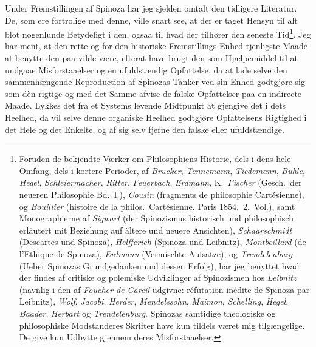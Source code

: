 \documentclass[12pt,a4paper]{book}
\newcommand{\opage}[1]{\marginnote{\footnotesize\textit{[#1]}}}
\begin{document}
Under Fremstillingen af Spinoza har jeg sjelden omtalt den tidligere
Literatur. De, som ere fortrolige med denne, ville snart see, at der
er taget Hensyn til alt blot nogenlunde Betydeligt i den, ogsaa til
hvad der tilhører den seneste Tid\footnote{Foruden de bekjendte Værker
om Philosophiens Historie, dels i dens hele Omfang, dels i kortere
Perioder, af \emph{Brucker}, \emph{Tennemann}, \emph{Tiedemann},
\emph{Buhle}, \emph{Hegel}, \emph{Schleiermacher}, \emph{Ritter},
\emph{Feuerbach}, \emph{Erdmann}, K.\ \emph{Fischer} (Gesch.\ der
neueren Philosophie Bd.\ I.), \emph{Cousin} (fragments de philosophie
Cartésienne), og \emph{Bouillier} (histoire de la philos.\ Cartésienne.
Paris 1854.\ 2.\ Vol.), samt Monographierne af \emph{Sigwart} (der
Spinozismus historisch und philosophisch erläutert mit Beziehung auf
ältere und neuere Ansichten), \emph{Schaarschmidt} (Descartes und
Spinoza), \emph{Helfferich} (Spinoza und Leibnitz),
\emph{Montbeillard} (de l'Ethique de Spinoza), \emph{Erdmann}
(Vermischte Aufsätze), og \emph{Trendelenburg} (Ueber Spinozas
Grundgedanken und dessen Erfolg), har jeg benyttet hvad der findes af
critiske og polemiske Udviklinger af Spinozismen hos \emph{Leibnitz}
(navnlig i den af \emph{Foucher de Careil} udgivne: réfutation inédite
de Spinoza par Leibnitz), \emph{Wolf}, \emph{Jacobi}, \emph{Herder},
\emph{Mendelssohn}, \emph{Maimon}, \emph{Schelling}, \emph{Hegel},
\emph{Baader}, \emph{Herbart} og \emph{Trendelenburg}. Spinozas
samtidige theologiske og philosophiske Modstanderes Skrifter have kun
tildels været mig tilgængelige. De give kun Udbytte gjennem deres
Misforstaaelser.}. Jeg har ment, at den rette og for den historiske
Fremstillings Enhed tjenligste Maade at benytte den paa vilde være,
efterat have brugt den som Hjælpemiddel til at
\opage{14} undgaae Misforstaaelser og en ufuldstændig Opfattelse, da at lade
selve den sammenhængende Reproduction af Spinozas Tanker ved sin Enhed
godtgjøre sig som dèn rigtige og med det Samme afvise de falske
Opfattelser paa en indirecte Maade. Lykkes det fra et Systems levende
Midtpunkt at gjengive det i dets Heelhed, da vil selve denne organiske
Heelhed godtgjøre Opfattelsens Rigtighed i det Hele og det Enkelte, og
af sig selv fjerne den falske eller ufuldstændige.
\end{document}
